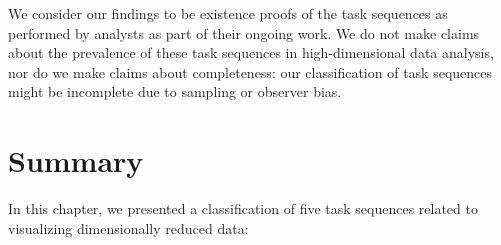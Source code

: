 We consider our findings to be existence proofs of the task sequences as performed by analysts as part of their ongoing work. 
We do not make claims about the prevalence of these task sequences in high-dimensional data analysis, nor do we make claims about completeness: our classification of task sequences might be incomplete due to sampling or observer bias. 


\section{Summary}
\label{drvistasks:conclusion}


In this chapter, we presented a classification of five task sequences related to visualizing dimensionally reduced data:

